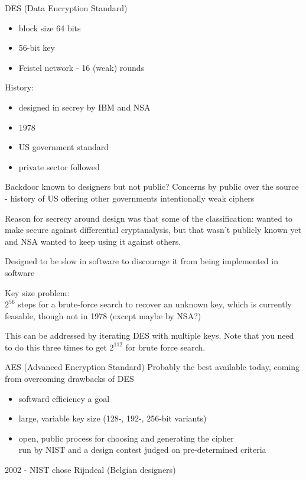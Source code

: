 \begin{example}{DES (Data Encryption Standard)}
    \begin{itemize}
        \item block size 64 bits
        \item 56-bit key
        \item Feistel network - 16 (weak) rounds
    \end{itemize}

    History:
    \begin{itemize}
        \item designed in secrey by IBM and NSA
        \item 1978
        \item US government standard
        \item private sector followed
    \end{itemize}

    Backdoor known to designers but not public? Concerns by public over the
    source - history of US offering other governments intentionally weak ciphers

    Reason for secrecy around design was that some of the classification: wanted
    to make secure against differential cryptanalysis, but that wasn't publicly
    known yet and NSA wanted to keep using it against others.

    Designed to be slow in software to discourage it from being implemented in
    software

    Key size problem:\\
    $2^{56}$ steps for a brute-force search to recover an unknown key, which is
    currently feasable, though not in 1978 (except maybe by NSA?)

    This can be addressed by iterating DES with multiple keys. Note that you
    need to do this three times to get $2^{112}$ for brute force search.
\end{example}

\begin{example}{AES (Advanced Encryption Standard)}
    Probably the best available today, coming from overcoming drawbacks of DES
    \begin{itemize}
        \item softward efficiency a goal
        \item large, variable key size (128-, 192-, 256-bit variants)
        \item open, public process for choosing and generating the cipher\\
            run by NIST and a design contest judged on pre-determined criteria
    \end{itemize}

    2002 - NIST chose Rijndeal (Belgian designers)
\end{example}

